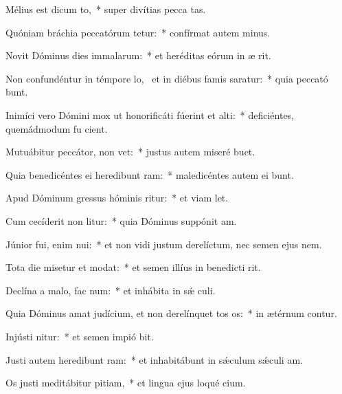 \item Mélius est dicum to,~* super divítias pecca tas.
\item Quóniam bráchia peccatórum tetur:~* confírmat autem  minus.
\item Novit Dóminus dies immalarum:~* et heréditas eórum in æ rit.
\item Non confundéntur in témpore lo,~\pscross{} et in diébus famis saratur:~* quia peccató bunt.
\item Inimíci vero Dómini mox ut honorificáti fúerint et alti:~* deficiéntes, quemádmodum fu cient.
\item Mutuábitur peccátor,  non vet:~* justus autem miseré  buet.
\item Quia benedicéntes ei heredibunt ram:~* maledicéntes autem ei bunt.
\item Apud Dóminum gressus hóminis ritur:~* et viam  let.
\item Cum cecíderit non litur:~* quia Dóminus suppónit  am.
\item Júnior fui, enim nui:~* et non vidi justum derelíctum, nec semen ejus  nem.
\item Tota die misetur et modat:~* et semen illíus in benedicti rit.
\item Declína a malo,  fac num:~* et inhábita in sǽ culi.
\item Quia Dóminus amat judícium, et non derelínquet tos os:~* in ætérnum contur.
\item Injústi nitur:~* et semen impió bit.
\item Justi autem heredibunt ram:~* et inhabitábunt in sǽculum sǽculi  am.
\item Os justi meditábitur pitiam,~* et lingua ejus loqué cium.
